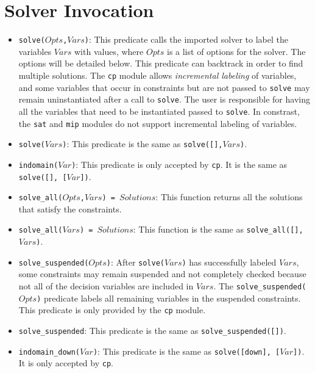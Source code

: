 \section{Solver Invocation}
\begin{itemize}
\item \texttt{solve($Opts$,$Vars$)}: This predicate calls the imported solver to label the variables $Vars$ with values, where $Opts$ is a list of options for the solver. The options will be detailed below. This predicate can backtrack in order to find multiple solutions. The \texttt{cp} module allows \textit{incremental labeling} of variables, and some variables that occur in constraints but are not passed to \texttt{solve} may remain uninstantiated after a call to \texttt{solve}. The user is responsible for having all the variables that need to be instantiated passed to \texttt{solve}. In constrast, the \texttt{sat} and \texttt{mip} modules do not support incremental labeling of variables.

\item\texttt{solve($Vars$)}: This predicate is the same as \texttt{solve([],$Vars$)}. 
\item \texttt{indomain($Var$)}: This predicate is only accepted by \texttt{cp}. It is the same as \texttt{solve([], [$Var$])}.
\item \texttt{solve\_all($Opts$,$Vars$) = $Solutions$}: This function returns all the solutions that satisfy the constraints.
\item \texttt{solve\_all($Vars$) = $Solutions$}: This function is the same as \texttt{solve\_all([],$Vars$)}.
\item \texttt{solve\_suspended($Opts$)}: After \texttt{solve($Vars$)} has successfully labeled $Vars$, some constraints may remain suspended and not completely checked because not all of the decision variables are included in $Vars$. The \texttt{solve\_suspended($Opts$)} predicate labels all remaining variables in the suspended constraints. This predicate is only provided by the \texttt{cp} module. 
\item \texttt{solve\_suspended}: This predicate is the same as \texttt{solve\_suspended([])}.
\item \texttt{indomain\_down($Var$)}: This predicate is the same as \texttt{solve([down], [$Var$])}. It is only accepted by \texttt{cp}. 
\end{itemize}


